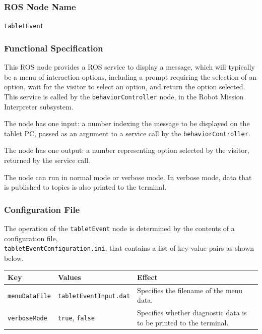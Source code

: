 \documentclass{CSSRforAfrica}
\begin{document}
{\subsubsection*{ROS Node Name}
 {\small \verb+tabletEvent+}   

\subsubsection*{Functional Specification}
This ROS node provides a ROS service to display a message, which will typically be a menu of interaction options, including a prompt requiring the selection of an option,  wait for the visitor to select an option, and return the option selected. This service is called by the {\small \verb+behaviorController+} node, in the Robot Mission Interpreter  subsystem.   

The node has one input: a number indexing the message to be displayed on the tablet PC, passed as an argument to a service call by the {\small \verb+behaviorController+}.
 
The node has one output: a number representing option selected by the visitor, returned  by the service call.

The node can run in normal mode or verbose mode. In verbose mode, data that is published to topics is also printed to the terminal.

\subsubsection*{Configuration File}

The operation of the {\small \verb+tabletEvent+} node is determined by the contents of a configuration file, \\
{\small \verb+tabletEventConfiguration.ini+}, that contains a list of key-value pairs as shown below.

 
\begin{center}
\begin{tabularx}{\linewidth}{| l | l | X|}
\hline 
{\small Key }                               & {\small Values }                                                 &  {\small Effect}       \\
\hline
{\footnotesize \verb+menuDataFile+}  & {\footnotesize \verb+tabletEventInput.dat+}   &  {\small Specifies the filename of the menu data.} \\ 
\hline
{\footnotesize \verb+verboseMode+}  & {\footnotesize \verb+true+, \verb+false+}     & {\small Specifies whether diagnostic data is to be printed to the terminal.} \\
\hline
\end{tabularx}
\end{center}
 



}
\end{document}
